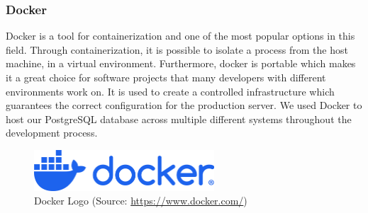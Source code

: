 \Author{\daAuthorTwo}

\subsubsection{Docker}
Docker is a tool for containerization and one of the most popular options in this field. Through containerization, it is possible to isolate a process from the host machine, in a virtual environment. Furthermore, docker is portable which makes it a great choice for software projects that many developers with different environments work on. It is used to create a controlled infrastructure which guarantees the correct configuration for the production server. We used Docker to host our PostgreSQL database across multiple different systems throughout the development process.

\begin{figure} [H]
    \center
    \includegraphics [width=0.6\textwidth] {images/Technologies/dockerLogo.png}
    \caption{Docker Logo (Source: \url{https://www.docker.com/})}
\end{figure}

\newpage